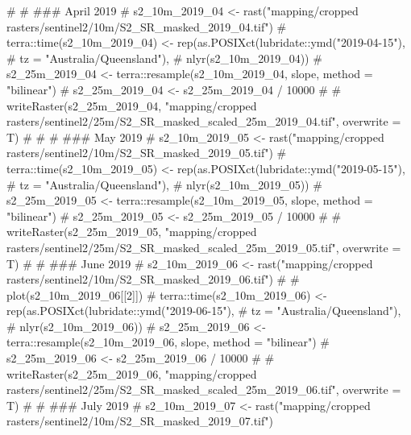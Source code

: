 \documentclass[
  letterpaper,
  DIV=11,
  numbers=noendperiod]{scrartcl}
\newenvironment{Shaded}{\begin{snugshade}}{\end{snugshade}}
\newcommand{\AlertTok}[1]{\textcolor[rgb]{0.68,0.00,0.00}{#1}}
\newcommand{\CommentTok}[1]{\textcolor[rgb]{0.37,0.37,0.37}{#1}}
\begin{document}
\begin{Shaded}
\begin{Highlighting}[]
\CommentTok{\# }
\CommentTok{\# }\AlertTok{\#\#\#}\CommentTok{ April 2019}
\CommentTok{\# s2\_10m\_2019\_04 \textless{}{-} rast("mapping/cropped rasters/sentinel2/10m/S2\_SR\_masked\_2019\_04.tif")}
\CommentTok{\# terra::time(s2\_10m\_2019\_04) \textless{}{-} rep(as.POSIXct(lubridate::ymd("2019{-}04{-}15"), }
\CommentTok{\#                                               tz = "Australia/Queensland"), }
\CommentTok{\#                                    nlyr(s2\_10m\_2019\_04))}
\CommentTok{\# s2\_25m\_2019\_04 \textless{}{-} terra::resample(s2\_10m\_2019\_04, slope, method = "bilinear")}
\CommentTok{\# s2\_25m\_2019\_04 \textless{}{-} s2\_25m\_2019\_04 / 10000}
\CommentTok{\# \# writeRaster(s2\_25m\_2019\_04, "mapping/cropped rasters/sentinel2/25m/S2\_SR\_masked\_scaled\_25m\_2019\_04.tif", overwrite = T)}
\CommentTok{\# }
\CommentTok{\# }
\CommentTok{\# }\AlertTok{\#\#\#}\CommentTok{ May 2019}
\CommentTok{\# s2\_10m\_2019\_05 \textless{}{-} rast("mapping/cropped rasters/sentinel2/10m/S2\_SR\_masked\_2019\_05.tif")}
\CommentTok{\# terra::time(s2\_10m\_2019\_05) \textless{}{-} rep(as.POSIXct(lubridate::ymd("2019{-}05{-}15"), }
\CommentTok{\#                                               tz = "Australia/Queensland"), }
\CommentTok{\#                                    nlyr(s2\_10m\_2019\_05))}
\CommentTok{\# s2\_25m\_2019\_05 \textless{}{-} terra::resample(s2\_10m\_2019\_05, slope, method = "bilinear")}
\CommentTok{\# s2\_25m\_2019\_05 \textless{}{-} s2\_25m\_2019\_05 / 10000}
\CommentTok{\# \# writeRaster(s2\_25m\_2019\_05, "mapping/cropped rasters/sentinel2/25m/S2\_SR\_masked\_scaled\_25m\_2019\_05.tif", overwrite = T)}
\CommentTok{\# }
\CommentTok{\# }\AlertTok{\#\#\#}\CommentTok{ June 2019}
\CommentTok{\# s2\_10m\_2019\_06 \textless{}{-} rast("mapping/cropped rasters/sentinel2/10m/S2\_SR\_masked\_2019\_06.tif")}
\CommentTok{\# \# plot(s2\_10m\_2019\_06[[2]])}
\CommentTok{\# terra::time(s2\_10m\_2019\_06) \textless{}{-} rep(as.POSIXct(lubridate::ymd("2019{-}06{-}15"), }
\CommentTok{\#                                               tz = "Australia/Queensland"), }
\CommentTok{\#                                    nlyr(s2\_10m\_2019\_06))}
\CommentTok{\# s2\_25m\_2019\_06 \textless{}{-} terra::resample(s2\_10m\_2019\_06, slope, method = "bilinear")}
\CommentTok{\# s2\_25m\_2019\_06 \textless{}{-} s2\_25m\_2019\_06 / 10000}
\CommentTok{\# \# writeRaster(s2\_25m\_2019\_06, "mapping/cropped rasters/sentinel2/25m/S2\_SR\_masked\_scaled\_25m\_2019\_06.tif", overwrite = T)}
\CommentTok{\# }
\CommentTok{\# }\AlertTok{\#\#\#}\CommentTok{ July 2019}
\CommentTok{\# s2\_10m\_2019\_07 \textless{}{-} rast("mapping/cropped rasters/sentinel2/10m/S2\_SR\_masked\_2019\_07.tif")}

\end{Highlighting}
\end{Shaded}
\end{document}
